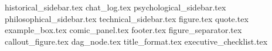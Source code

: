 {historical_sidebar.tex}
{chat_log.tex}
{psychological_sidebar.tex}
{philosophical_sidebar.tex}
{technical_sidebar.tex}
{figure.tex}
{quote.tex}
{example_box.tex}
{comic_panel.tex}
{footer.tex}
{figure_separator.tex}
{callout_figure.tex}
{dag_node.tex}
{title_format.tex}
{executive_checklist.tex}
